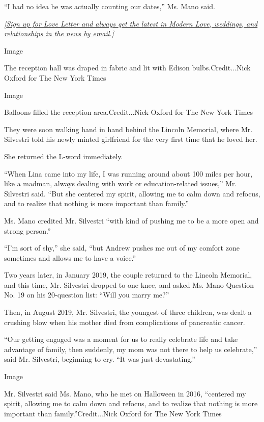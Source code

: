 ``I had no idea he was actually counting our dates,'' Ms. Mano said.

\emph{{[}}\href{https://www.nytimes3xbfgragh.onion/newsletters/love-letter?module=inline}{\emph{Sign
up for Love Letter and always get the latest in Modern Love, weddings,
and relationships in the news by email.}}\emph{{]}}

Image

The reception hall was draped in fabric and lit with Edison
bulbs.Credit...Nick Oxford for The New York Times

Image

Balloons filled the reception area.Credit...Nick Oxford for The New York
Times

They were soon walking hand in hand behind the Lincoln Memorial, where
Mr. Silvestri told his newly minted girlfriend for the very first time
that he loved her.

She returned the L-word immediately.

``When Lina came into my life, I was running around about 100 miles per
hour, like a madman, always dealing with work or education-related
issues,'' Mr. Silvestri said. ``But she centered my spirit, allowing me
to calm down and refocus, and to realize that nothing is more important
than family.''

Ms. Mano credited Mr. Silvestri ``with kind of pushing me to be a more
open and strong person.''

``I'm sort of shy,'' she said, ``but Andrew pushes me out of my comfort
zone sometimes and allows me to have a voice.''

Two years later, in January 2019, the couple returned to the Lincoln
Memorial, and this time, Mr. Silvestri dropped to one knee, and asked
Ms. Mano Question No. 19 on his 20-question list: ``Will you marry me?''

Then, in August 2019, Mr. Silvestri, the youngest of three children, was
dealt a crushing blow when his mother died from complications of
pancreatic cancer.

``Our getting engaged was a moment for us to really celebrate life and
take advantage of family, then suddenly, my mom was not there to help us
celebrate,'' said Mr. Silvestri, beginning to cry. ``It was just
devastating.''

Image

Mr. Silvestri said Ms. Mano, who he met on Halloween in 2016, ``centered
my spirit, allowing me to calm down and refocus, and to realize that
nothing is more important than family.''Credit...Nick Oxford for The New
York Times

